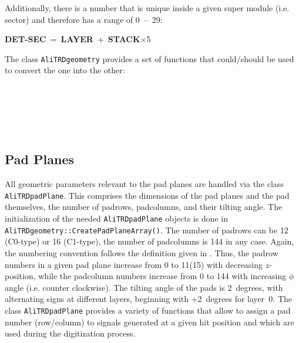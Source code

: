 \documentclass{alicetdr}
\begin{document}
Additionally, there is a number that is unique inside a given super module (i.e.
sector) and therefore has a range of 0~--~29:
\begin{center}
\mbox{{\bf DET-SEC} = {\bf LAYER} + {\bf STACK}$\times$5}
\end{center}
The class {\tt AliTRDgeometry} provides a set of functions that could/should
be used to convert the one into the other:\\
\hspace*{1.5cm}{\tt AliTRDgeometry::GetDetector(layer,stack,sector)} \\
\hspace*{1.5cm}{\tt AliTRDgeometry::GetDetectorSec(layer,stack)}     \\
\hspace*{1.5cm}{\tt AliTRDgeometry::GetLayer(det)}                   \\
\hspace*{1.5cm}{\tt AliTRDgeometry::GetStack(det)}                   \\
\hspace*{1.5cm}{\tt AliTRDgeometry::GetSector(det)}                  \\
%
\subsection{Pad Planes}
%
All geometric parameters relevant to the pad planes are handled via the
class {\tt AliTRDpadPlane}.  This comprises the dimensions of the pad planes
and the pad themselves, the number of padrows, padcolumns, and their tilting angle.
The initialization of the needed {\tt AliTRDpadPlane} objects is done in
{\tt AliTRDgeometry::CreatePadPlaneArray()}.  The number of padrows can be 12
(C0-type) or 16 (C1-type), the number of padcolumns is 144 in any case.  Again,
the numbering convention follows the definition given in \cite{DAVID}.  Thus,
the padrow numbers in a given pad plane increase from 0 to 11(15) with decreasing
$z$-position, while the padcolumn numbers increase from 0 to 144 with increasing
$\phi$ angle (i.e. counter clockwise).  The tilting angle of the pads is 2~degrees,
with alternating signs at different layers, beginning with +2~degrees for layer~0.
The class {\tt AliTRDpadPlane} provides a variety of functions that allow to assign
a pad number (row/column) to signals generated at a given hit position and which
are used during the digitization process.
%
\end{document}
